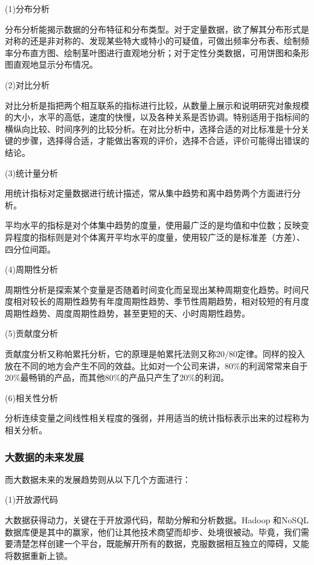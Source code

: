 
(1)分布分析 

 分布分析能揭示数据的分布特征和分布类型。对于定量数据，欲了解其分布形式是对称的还是非对称的、发现某些特大或特小的可疑值，可做出频率分布表、绘制频率分布直方图、绘制茎叶图进行直观地分析；对于定性分类数据，可用饼图和条形图直观地显示分布情况。

(2)对比分析

对比分析是指把两个相互联系的指标进行比较，从数量上展示和说明研究对象规模的大小，水平的高低，速度的快慢，以及各种关系是否协调。特别适用于指标间的横纵向比较、时间序列的比较分析。在对比分析中，选择合适的对比标准是十分关键的步骤，选择得合适，才能做出客观的评价，选择不合适，评价可能得出错误的结论。

(3)统计量分析 

 用统计指标对定量数据进行统计描述，常从集中趋势和离中趋势两个方面进行分析。

 平均水平的指标是对个体集中趋势的度量，使用最广泛的是均值和中位数；反映变异程度的指标则是对个体离开平均水平的度量，使用较广泛的是标准差（方差）、四分位间距。

(4)周期性分析 

 周期性分析是探索某个变量是否随着时间变化而呈现出某种周期变化趋势。时间尺度相对较长的周期性趋势有年度周期性趋势、季节性周期趋势，相对较短的有月度周期性趋势、周度周期性趋势，甚至更短的天、小时周期性趋势。

(5)贡献度分析 

 贡献度分析又称帕累托分析，它的原理是帕累托法则又称20/80定律。同样的投入放在不同的地方会产生不同的效益。比如对一个公司来讲，80\%的利润常常来自于20\%最畅销的产品，而其他80\%的产品只产生了20\%的利润。

(6)相关性分析 

 分析连续变量之间线性相关程度的强弱，并用适当的统计指标表示出来的过程称为相关分析。
\subsubsection{大数据的未来发展}

而大数据未来的发展趋势则从以下几个方面进行：



(1)开放源代码

大数据获得动力，关键在于开放源代码，帮助分解和分析数据。Hadoop 和NoSQL 数据库便是其中的赢家，他们让其他技术商望而却步、处境很被动。毕竟，我们需要清楚怎样创建一个平台，既能解开所有的数据，克服数据相互独立的障碍，又能将数据重新上锁。

